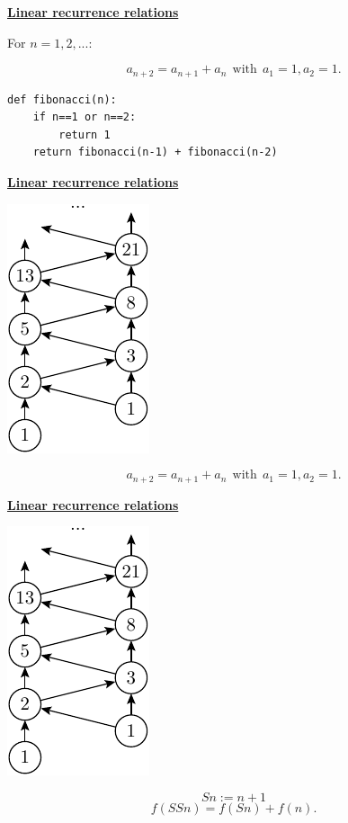 \documentclass[11pt]{article}
\def\heading #1{\centerline{\underline{\bf\LARGE #1}}}
\def\vsp {\vskip 0.5cm}
\begin{document}
\newpage %

\heading{Linear recurrence relations}

\vsp
For $n=1,2,...:$

$$
    a_{n+2} = a_{n+1} + a_n \ \ \mbox{with}\ \  a_1=1, a_2=1.
$$
\vsp
\vsp
\begin{verbatim}
def fibonacci(n):
    if n==1 or n==2:
        return 1
    return fibonacci(n-1) + fibonacci(n-2)
\end{verbatim}


\newpage %

\heading{Linear recurrence relations}

\vsp
\centerline{\includegraphics[]{pic-fibonacci.pdf}}
$$
    a_{n+2} = a_{n+1} + a_n \ \ \mbox{with}\ \  a_1=1, a_2=1.
$$


\newpage %

\heading{Linear recurrence relations}

\vsp
\centerline{\includegraphics[]{pic-fibonacci.pdf}}
$$
    Sn := n+1
$$
$$
    f(SSn) = f(Sn) + f(n).
$$
\end{document}
